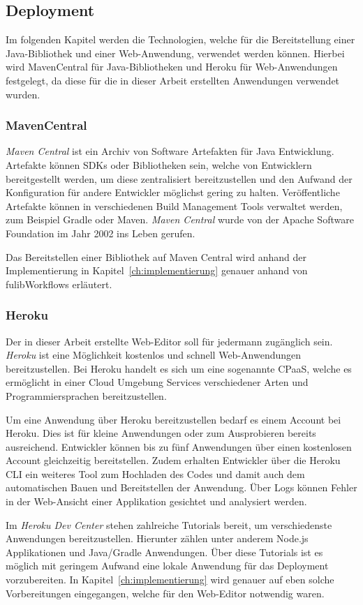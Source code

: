 \subsection{Deployment}\label{subsec:deployment}
Im folgenden Kapitel werden die Technologien, welche für die Bereitstellung einer Java-Bibliothek und einer Web-Anwendung, verwendet werden können.
Hierbei wird MavenCentral für Java-Bibliotheken und Heroku für Web-Anwendungen festgelegt, da diese für die in dieser Arbeit erstellten
Anwendungen verwendet wurden.

\subsubsection{MavenCentral}\label{subsubsec:mavencentral}
\textit{Maven Central} ist ein Archiv von Software Artefakten für Java Entwicklung.
Artefakte können \ac*{SDK}s oder Bibliotheken sein, welche von Entwicklern bereitgestellt werden, um diese zentralisiert bereitzustellen
und den Aufwand der Konfiguration für andere Entwickler möglichst gering zu halten.\cite*{maven}
Veröffentliche Artefakte können in verschiedenen Build Management Tools verwaltet werden, zum Beispiel Gradle oder Maven.
\textit{Maven Central} wurde von der Apache Software Foundation im Jahr 2002 ins Leben gerufen.

Das Bereitstellen einer Bibliothek auf Maven Central wird anhand der Implementierung in Kapitel~\ref{ch:implementierung} genauer anhand von
fulibWorkflows erläutert.


\subsubsection{Heroku}\label{subsubsec:heroku}
Der in dieser Arbeit erstellte Web-Editor soll für jedermann zugänglich sein.
\textit{Heroku} ist eine Möglichkeit kostenlos und schnell Web-Anwendungen bereitzustellen.
Bei Heroku handelt es sich um eine sogenannte \ac*{CPaaS}, welche es ermöglicht in einer Cloud Umgebung
Services verschiedener Arten und Programmiersprachen bereitzustellen.\cite*{heroku}

Um eine Anwendung über Heroku bereitzustellen bedarf es einem Account bei Heroku.
Dies ist für kleine Anwendungen oder zum Ausprobieren bereits ausreichend.
Entwickler können bis zu fünf Anwendungen über einen kostenlosen Account gleichzeitig bereitstellen.
Zudem erhalten Entwickler über die Heroku CLI ein weiteres Tool zum Hochladen des Codes und damit auch dem automatischen
Bauen und Bereitstellen der Anwendung.
Über Logs können Fehler in der Web-Ansicht einer Applikation gesichtet und analysiert werden.

Im \textit{Heroku Dev Center} stehen zahlreiche Tutorials bereit, um verschiedenste Anwendungen bereitzustellen.
Hierunter zählen unter anderem Node.js Applikationen und Java/Gradle Anwendungen.\cite*{herokuDev}
Über diese Tutorials ist es möglich mit geringem Aufwand eine lokale Anwendung für das Deployment vorzubereiten.
In Kapitel~\ref{ch:implementierung} wird genauer auf eben solche Vorbereitungen eingegangen, welche für den Web-Editor notwendig waren.
